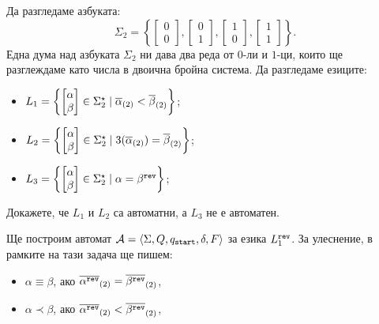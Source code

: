 \begin{extra}

    \begin{problem}
  Да разгледаме азбуката:
  \[\Sigma_2 = \left\{\begin{bmatrix} 0\\0\end{bmatrix},\begin{bmatrix} 0\\1\end{bmatrix},\begin{bmatrix} 1\\0\end{bmatrix},\begin{bmatrix} 1\\1\end{bmatrix}\right\}.\]
  Една дума над азбуката $\Sigma_2$ ни дава два реда от $0$-ли и $1$-ци, които ще разглеждаме като числа в двоична бройна система.
  Да разгледаме езиците:
  \begin{itemize}
  \item 
    $L_1 = \left\{\begin{bmatrix} \alpha\\ \beta \end{bmatrix} \in \Sigma^\star_2 \mid \overline{\alpha}_{(2)} < \overline{\beta}_{(2)}\right\}$;
  \item
    $L_2 = \left\{\begin{bmatrix} \alpha\\ \beta \end{bmatrix} \in \Sigma^\star_2 \mid 3(\overline{\alpha}_{(2)}) = \overline{\beta}_{(2)}\right\}$;
  \item
    $L_3 = \left\{\begin{bmatrix} \alpha\\ \beta \end{bmatrix} \in \Sigma^\star_2 \mid \alpha = \beta^{\texttt{rev}}\right\}$;
  \end{itemize}
  Докажете, че  $L_1$ и $L_2$ са автоматни, а $L_3$ не е автоматен.
\end{problem}
\ifhints
\begin{hint}
  Ще построим автомат $\mathcal{A} = \langle{\Sigma,Q,q_{\texttt{start}},\delta,F}\rangle$ за езика $L^{\texttt{rev}}_1$.
  За улеснение, в рамките на тази задача ще пишем:
  \begin{itemize}
  \item 
    $\alpha \equiv \beta$, ако $\overline{\alpha^{\texttt{rev}}}_{(2)} = \overline{\beta^{\texttt{rev}}}_{(2)}$,
  \item
    $\alpha \prec \beta$, ако $\overline{\alpha^{\texttt{rev}}}_{(2)} < \overline{\beta^{\texttt{rev}}}_{(2)}$,

\end{itemize}
\end{hint}
\end{extra}
